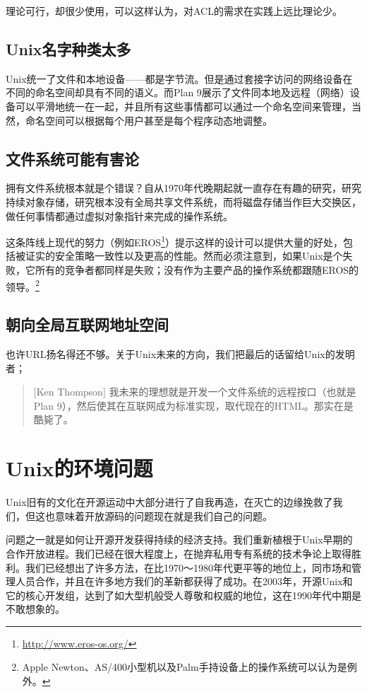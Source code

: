 \documentclass[12pt,oneside]{ctexbook}
\begin{document}
\begin{common-format}
理论可行，却很少使用，可以这样认为，对ACL的需求在实践上远比理论少。

\subsection{Unix名字种类太多}
Unix统一了文件和本地设备——都是字节流。但是通过套接字访问的网络设备在不同的命名空间却具有不同的语义。而Plan 9展示了文件同本地及远程（网络）设备可以平滑地统一在一起，并且所有这些事情都可以通过一个命名空间来管理，当然，命名空间可以根据每个用户甚至是每个程序动态地调整。

\subsection{文件系统可能有害论}
拥有文件系统根本就是个错误？自从1970年代晚期起就一直存在有趣的研究，研究持续对象存储，研究根本没有全局共享文件系统，而将磁盘存储当作巨大交换区，做任何事情都通过虚拟对象指针来完成的操作系统。

这条阵线上现代的努力（例如EROS\footnote{\href{http://www.eros-os.org/}{http://www.eros-os.org/}}）提示这样的设计可以提供大量的好处，包括被证实的安全策略一致性以及更高的性能。然而必须注意到，如果Unix是个失败，它所有的竞争者都同样是失败；没有作为主要产品的操作系统都跟随EROS的领导。\footnote{Apple Newton、AS/400小型机以及Palm手持设备上的操作系统可以认为是例外。}

\subsection{朝向全局互联网地址空间}
也许URL扬名得还不够。关于Unix未来的方向，我们把最后的话留给Unix的发明者；
\begin{quote}[Ken Thompson]
我未来的理想就是开发一个文件系统的远程按口（也就是Plan 9），然后使其在互联网成为标准实现，取代现在的HTML。那实在是酷毙了。
\end{quote}

\section{Unix的环境问题}
Unix旧有的文化在开源运动中大部分进行了自我再造，在灭亡的边缘挽救了我们，但这也意味着开放源码的问题现在就是我们自己的问题。

问题之一就是如何让开源开发获得持续的经济支持。我们重新植根于Unix早期的合作开放进程。我们已经在很大程度上，在抛弃私用专有系统的技术争论上取得胜利。我们已经想出了许多方法，在比1970～1980年代更平等的地位上，同市场和管理人员合作，并且在许多地方我们的革新都获得了成功。在2003年，开源Unix和它的核心开发组，达到了如大型机般受人尊敬和权威的地位，这在1990年代中期是不敢想象的。


\end{common-format}
\end{document}

